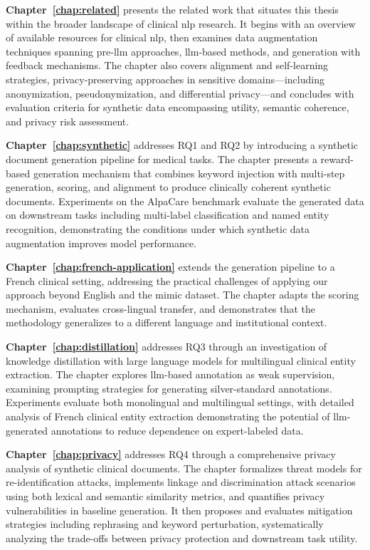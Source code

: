\textbf{Chapter~\ref{chap:related}} presents the related work that situates this thesis within the broader landscape of clinical \gls{nlp} research. It begins with an overview of available resources for clinical \gls{nlp}, then examines data augmentation techniques spanning pre-\gls{llm} approaches, \gls{llm}-based methods, and generation with feedback mechanisms. The chapter also covers alignment and self-learning strategies, privacy-preserving approaches in sensitive domains---including anonymization, pseudonymization, and differential privacy---and concludes with evaluation criteria for synthetic data encompassing utility, semantic coherence, and privacy risk assessment.

\textbf{Chapter~\ref{chap:synthetic}} addresses RQ1 and RQ2 by introducing a synthetic document generation pipeline for medical tasks. The chapter presents a reward-based generation mechanism that combines keyword injection with multi-step generation, scoring, and alignment to produce clinically coherent synthetic documents. Experiments on the AlpaCare benchmark evaluate the generated data on downstream tasks including multi-label classification and named entity recognition, demonstrating the conditions under which synthetic data augmentation improves model performance.

\textbf{Chapter~\ref{chap:french-application}} extends the generation pipeline to a French clinical setting, addressing the practical challenges of applying our approach beyond English and the \gls{mimic} dataset. The chapter adapts the scoring mechanism, evaluates cross-lingual transfer, and demonstrates that the methodology generalizes to a different language and institutional context.

\textbf{Chapter~\ref{chap:distillation}} addresses RQ3 through an investigation of knowledge distillation with large language models for multilingual clinical entity extraction. The chapter explores \gls{llm}-based annotation as weak supervision, examining prompting strategies for generating silver-standard annotations. Experiments evaluate both monolingual and multilingual settings, with detailed analysis of French clinical entity extraction demonstrating the potential of \gls{llm}-generated annotations to reduce dependence on expert-labeled data.

\textbf{Chapter~\ref{chap:privacy}} addresses RQ4 through a comprehensive privacy analysis of synthetic clinical documents. The chapter formalizes threat models for re-identification attacks, implements linkage and discrimination attack scenarios using both lexical and semantic similarity metrics, and quantifies privacy vulnerabilities in baseline generation. It then proposes and evaluates mitigation strategies including rephrasing and keyword perturbation, systematically analyzing the trade-offs between privacy protection and downstream task utility.


